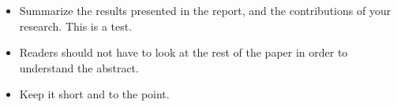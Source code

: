 \begin{itemize}
\item Summarize the results presented in the report, and the contributions
of your research. This is a test. 

\item Readers should not have to look at the rest of the paper in order to 
understand the abstract.

\item Keep it short and to the point.
\end{itemize}